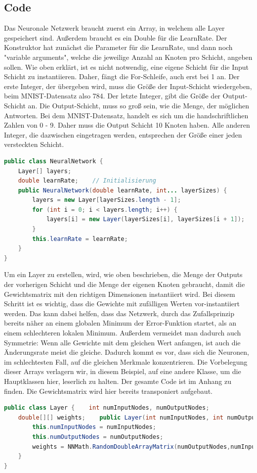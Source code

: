 \documentclass[12pt]{article}
\begin{document}
\subsection{Code}
Das Neuronale Netzwerk braucht zuerst ein Array, in welchem alle Layer gespeichert sind. Außerdem braucht es ein Double für die LearnRate. Der Konstruktor hat zunächst die Parameter für die LearnRate, und dann noch "variable arguments", welche die jeweilige Anzahl an Knoten pro Schicht, angeben sollen. Wie oben erklärt, ist es nicht notwendig, eine eigene Schicht für die Input Schicht zu instantiieren. Daher, fängt die For-Schleife, auch erst bei 1 an. Der erste Integer, der übergeben wird, muss die Größe der Input-Schicht wiedergeben, beim MNIST-Datensatz also 784. Der letzte Integer, gibt die Größe der Output-Schicht an. Die Output-Schicht, muss so groß sein, wie die Menge, der möglichen Antworten. Bei dem MNIST-Datensatz, handelt es sich um die handschriftlichen Zahlen von 0 - 9. Daher muss die Output Schicht 10 Knoten haben. Alle anderen Integer, die dazwischen eingetragen werden, entsprechen der Größe einer jeden versteckten Schicht.
\begin{lstlisting}[language=Java]
public class NeuralNetwork {
    Layer[] layers;
    double learnRate;    // Initialisierung
    public NeuralNetwork(double learnRate, int... layerSizes) {
        layers = new Layer[layerSizes.length - 1];
        for (int i = 0; i < layers.length; i++) {
            layers[i] = new Layer(layerSizes[i], layerSizes[i + 1]);
        }
        this.learnRate = learnRate;
    }
}
\end{lstlisting}
Um ein Layer zu erstellen, wird, wie oben beschrieben, die Menge der Outputs der vorherigen Schicht und die Menge der eigenen Knoten gebraucht, damit die Gewichtsmatrix mit den richtigen Dimensionen instantiiert wird. Bei diesem Schritt ist es wichtig, dass die Gewichte mit zufälligen Werten vor-instantiiert werden. Das kann dabei helfen, dass das Netzwerk, durch das Zufallsprinzip bereits näher an einem globalen Minimum der Error-Funktion startet, als an einem schlechteren lokalen Minimum. Außerdem vermeidet man dadurch auch Symmetrie: Wenn alle Gewichte mit dem gleichen Wert anfangen, ist auch die Änderungsrate meist die gleiche. Dadurch kommt es vor, dass sich die Neuronen, im schlechtesten Fall, auf die gleichen Merkmale konzentrieren. Die Vorbelegung dieser Arrays verlagern wir, in diesem Beispiel, auf eine andere Klasse, um die Hauptklassen hier, leserlich zu halten. Der gesamte Code ist im Anhang zu finden. Die Gewichtsmatrix wird hier bereits transponiert aufgebaut.\begin{lstlisting}[language=Java]
public class Layer {    int numInputNodes, numOutputNodes;
    double[][] weights;    public Layer(int numInputNodes, int numOutputNodes) {
        this.numInputNodes = numInputNodes;
        this.numOutputNodes = numOutputNodes;
        weights = NNMath.RandomDoubleArrayMatrix(numOutputNodes,numInputNodes);
    }
}
\end{lstlisting}
\end{document}
